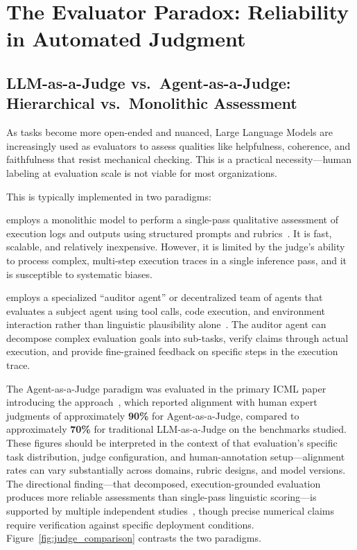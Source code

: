 \section{The Evaluator Paradox: Reliability in Automated Judgment}
\label{sec:evaluator}

\subsection{LLM-as-a-Judge vs.\ Agent-as-a-Judge: Hierarchical vs.\ Monolithic Assessment}

As tasks become more open-ended and nuanced, Large Language Models are increasingly used as evaluators to assess qualities like helpfulness, coherence, and faithfulness that resist mechanical checking. This is a practical necessity---human labeling at evaluation scale is not viable for most organizations.

This is typically implemented in two paradigms:

 employs a monolithic model to perform a single-pass qualitative assessment of execution logs and outputs using structured prompts and rubrics~\citep{agent_as_judge_survey}. It is fast, scalable, and relatively inexpensive. However, it is limited by the judge's ability to process complex, multi-step execution traces in a single inference pass, and it is susceptible to systematic biases.

 employs a specialized ``auditor agent'' or decentralized team of agents that evaluates a subject agent using tool calls, code execution, and environment interaction rather than linguistic plausibility alone~\citep{agent_as_judge_icml}. The auditor agent can decompose complex evaluation goals into sub-tasks, verify claims through actual execution, and provide fine-grained feedback on specific steps in the execution trace.

The Agent-as-a-Judge paradigm was evaluated in the primary ICML paper introducing the approach~\citep{agent_as_judge_icml}, which reported alignment with human expert judgments of approximately \textbf{90\%} for Agent-as-a-Judge, compared to approximately \textbf{70\%} for traditional LLM-as-a-Judge on the benchmarks studied. These figures should be interpreted in the context of that evaluation's specific task distribution, judge configuration, and human-annotation setup---alignment rates can vary substantially across domains, rubric designs, and model versions. The directional finding---that decomposed, execution-grounded evaluation produces more reliable assessments than single-pass linguistic scoring---is supported by multiple independent studies~\citep{agent_as_judge_survey}, though precise numerical claims require verification against specific deployment conditions. Figure~\ref{fig:judge_comparison} contrasts the two paradigms.

